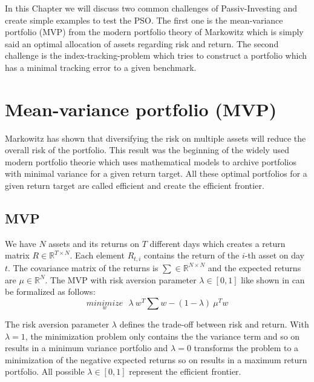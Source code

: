 \documentclass[
  oneside]{book}
\begin{document}
In this Chapter we will discuss two common challenges of Passiv-Investing and create simple examples to test the PSO. The first one is the mean-variance portfolio (MVP) from the modern portfolio theory of Markowitz which is simply said an optimal allocation of assets regarding risk and return. The second challenge is the index-tracking-problem which tries to construct a portfolio which has a minimal tracking error to a given benchmark.

\hypertarget{mean-variance-portfolio-mvp}{%
\section{Mean-variance portfolio (MVP)}\label{mean-variance-portfolio-mvp}}

Markowitz has shown that diversifying the risk on multiple assets will reduce the overall risk of the portfolio. This result was the beginning of the widely used modern portfolio theorie which uses mathematical models to archive portfolios with minimal variance for a given return target. All these optimal portfolios for a given return target are called efficient and create the efficient frontier.

\hypertarget{mvp}{%
\subsection{MVP}\label{mvp}}

We have \(N\) assets and its returns on \(T\) different days which creates a return matrix \(R \in \mathbb{R}^{T \times N}\). Each element \(R_{t,i}\) contains the return of the \(i\)-th asset on day \(t\). The covariance matrix of the returns is \(\textstyle\sum \in \mathbb{R}^{N \times N}\) and the expected returns are \(\mu \in \mathbb{R}^{N}\). The MVP with risk aversion parameter \(\lambda \in [0,1]\) like shown in \citep{Mari2005} can be formalized as follows:
\begin{equation} 
\underset{w}{minimize} \ \ \ \lambda \ w^T \textstyle\sum w - (1-\lambda) \ \mu^T w
\label{eq:MVP}
\end{equation}

The risk aversion parameter \(\lambda\) defines the trade-off between risk and return. With \(\lambda = 1\), the minimization problem only contains the the variance term and so on results in a minimum variance portfolio and \(\lambda = 0\) transforms the problem to a minimization of the negative expected returns so on results in a maximum return portfolio. All possible \(\lambda \in [0, 1]\) represent the efficient frontier.
\end{document}
